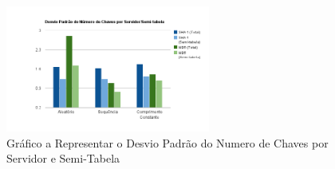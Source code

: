 \documentclass[times, 10pt,twocolumn]{article}
\begin{document}

\begin{figure}[h]
		\centering
		\includegraphics[width=0.6\textwidth]{graficoChavesServidor}
  		 \caption{Gráfico a Representar o Desvio Padrão do Numero de Chaves por Servidor e Semi-Tabela}
	\end{figure}




\nocite{ex1,ex2}


\end{document}

